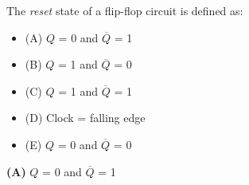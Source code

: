 

The {\it reset} state of a flip-flop circuit is defined as:

\begin{itemize}
\item{(A)} $Q$ = 0 and $\overline{Q}$ = 1
\vskip 5pt 
\item{(B)} $Q$ = 1 and $\overline{Q}$ = 0
\vskip 5pt 
\item{(C)} $Q$ = 1 and $\overline{Q}$ = 1
\vskip 5pt 
\item{(D)} Clock = falling edge
\vskip 5pt 
\item{(E)} $Q$ = 0 and $\overline{Q}$ = 0
\end{itemize}







{\bf (A)} $Q$ = 0 and $\overline{Q}$ = 1
 










